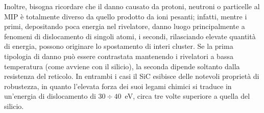 Inoltre, bisogna ricordare che il danno causato da protoni, neutroni o particelle al MIP è totalmente diverso da quello prodotto da ioni pesanti; infatti, mentre i primi, depositando poca energia nel rivelatore, danno luogo principalmente a fenomeni di dislocamento di singoli atomi, i secondi, rilasciando elevate quantità di energia, possono originare lo spostamento di interi cluster.
Se la prima tipologia di danno può essere contrastata mantenendo i rivelatori a bassa temperatura (come avviene con il silicio), la seconda dipende soltanto dalla resistenza del reticolo.
In entrambi i casi il SiC esibisce delle notevoli proprietà di robustezza, in quanto l'elevata forza dei suoi legami chimici si traduce in un'energia di dislocamento di $30 \div 40$~eV, circa tre volte superiore a quella del silicio. 




%
%
%
%


